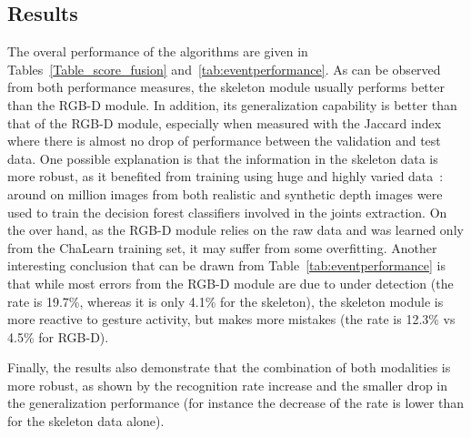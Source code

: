


\subsection{Results}\label{sec:results}



%
The overal performance of the algorithms are given in Tables~\ref{Table_score_fusion} and~\ref{tab:eventperformance}.
%
As can be observed from both performance measures, the skeleton module usually  performs better than the RGB-D module.
In addition, its generalization capability  is better than that of the RGB-D module,
especially when measured with the Jaccard index where there is almost no drop of performance between the validation and test data.
%
One possible explanation is that the information in the skeleton data is more robust, as it benefited from training using huge and highly
varied data~\cite{shotton2011real}: around on million images from both realistic and synthetic depth images were used to train
the decision forest classifiers involved in the joints extraction.
%
On the over hand, as the  RGB-D module relies on  the raw data and was learned only from the ChaLearn training set, it may
suffer from some overfitting.
%
Another interesting conclusion that can be drawn from Table~\ref{tab:eventperformance} is that while most errors from the RGB-D module are due to under detection
(the \eventmissed rate is 19.7\%, whereas it is only 4.1\% for the skeleton), the skeleton module is more reactive to gesture activity, but makes more mistakes
(the \eventconfused rate is 12.3\% vs 4.5\% for RGB-D).


Finally, the results also demonstrate  that the combination of both modalities is more robust,
as shown by the recognition rate increase and the smaller drop in the generalization performance
(for instance the decrease of the \eventaccuracy rate is lower than for the skeleton data alone).

